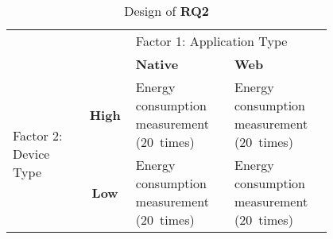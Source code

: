 \begin{table}[!ht]
    \centering
    \begin{tabular}{p{0.2\linewidth}p{0.1\linewidth}|p{0.25\linewidth}|p{0.25\linewidth}|}
        \cline{3-4}
         & & \multicolumn{2}{p{0.5\linewidth}|}{Factor 1: Application Type}  \\ \cline{3-4}
         & & \textbf{Native} & \textbf{Web}\\
        \hline
        \multicolumn{1}{|p{0.2\linewidth}}{\multirow{2}{\linewidth}{Factor 2: Device Type}} &
        \multicolumn{1}{|c|}{\textbf{High}}& Energy consumption measurement (20~times) & Energy consumption measurement (20~times)\\
        \cline{2-4}
        \multicolumn{1}{|c}{}&\multicolumn{1}{|c|}{\textbf{Low}} & Energy consumption measurement (20~times) & Energy consumption measurement (20~times)\\ \hline
    \end{tabular}
    \caption{Design of \textbf{RQ2}}
    \label{tab:factor2}
\end{table}